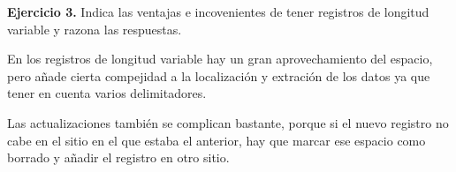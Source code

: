\documentclass[12pt]{report}
\begin{document}
\textbf{Ejercicio 3.} Indica las ventajas e incovenientes de tener registros de longitud variable y razona las respuestas.

En los registros de longitud variable hay un gran aprovechamiento del espacio, pero añade cierta compejidad a la localización y extración de los datos ya que tener en cuenta varios delimitadores.

Las actualizaciones también se complican bastante, porque si el nuevo registro no cabe en el sitio en el que estaba el anterior, hay que marcar ese espacio como borrado y añadir el registro en otro sitio.
\end{document}
